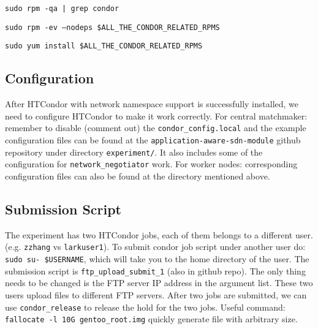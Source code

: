 \documentclass[a4paper]{article}
\begin{document}
{\tt sudo rpm -qa | grep condor}

{\tt sudo rpm -ev --nodeps \$ALL\_THE\_CONDOR\_RELATED\_RPMS}

{\tt sudo yum install \$ALL\_THE\_CONDOR\_RELATED\_RPMS}

\subsection{Configuration}
After HTCondor with network namespace support is successfully installed, we need to configure HTCondor to make it work correctly.\newline \newline
For central matchmaker: remember to disable (comment out) the {\tt condor\_config.local} and the example configuration files can be found at the {\tt application-aware-sdn-module} github repository under directory  {\tt experiment/}. It also includes some of the configuration for {\tt network\_negotiator} work.\newline \newline
For worker nodes: corresponding configuration files can also be found at the directory mentioned above.

\subsection{Submission Script}
The experiment has two HTCondor jobs, each of them belongs to a different user. (e.g. {\tt zzhang} vs {\tt larkuser1}). To submit condor job script under another user do: {\tt sudo su- \$USERNAME}, which will take you to the home directory of the user.\newline \newline
The submission script is {\tt ftp\_upload\_submit\_1} (also in github repo). The only thing needs to be changed is the FTP server IP address in the argument list. These two users upload files to different FTP servers.\newline \newline
After two jobs are submitted, we can use {\tt condor\_release} to release the hold for the two jobs.\newline \newline
Useful command: {\tt fallocate -l 10G gentoo\_root.img} quickly generate file with arbitrary size.
\end{document}
